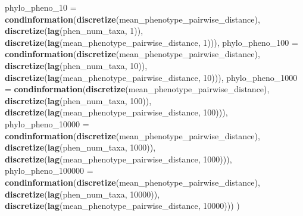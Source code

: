 \documentclass[]{book}
\newenvironment{Shaded}{\begin{snugshade}}{\end{snugshade}}
\newcommand{\DataTypeTok}[1]{\textcolor[rgb]{0.13,0.29,0.53}{#1}}
\newcommand{\DecValTok}[1]{\textcolor[rgb]{0.00,0.00,0.81}{#1}}
\newcommand{\KeywordTok}[1]{\textcolor[rgb]{0.13,0.29,0.53}{\textbf{#1}}}
\newcommand{\NormalTok}[1]{#1}
\begin{document}
\begin{Shaded}
\begin{Highlighting}[]
{  \DataTypeTok{phylo_pheno_10 =}     \KeywordTok{condinformation}\NormalTok{(}\KeywordTok{discretize}\NormalTok{(mean_phenotype_pairwise_distance),}
                                       \KeywordTok{discretize}\NormalTok{(}\KeywordTok{lag}\NormalTok{(phen_num_taxa, }\DecValTok{1}\NormalTok{)),}
                                       \KeywordTok{discretize}\NormalTok{(}\KeywordTok{lag}\NormalTok{(mean_phenotype_pairwise_distance, }\DecValTok{1}\NormalTok{))),}
  \DataTypeTok{phylo_pheno_100 =}    \KeywordTok{condinformation}\NormalTok{(}\KeywordTok{discretize}\NormalTok{(mean_phenotype_pairwise_distance),}
                                       \KeywordTok{discretize}\NormalTok{(}\KeywordTok{lag}\NormalTok{(phen_num_taxa, }\DecValTok{10}\NormalTok{)),}
                                       \KeywordTok{discretize}\NormalTok{(}\KeywordTok{lag}\NormalTok{(mean_phenotype_pairwise_distance, }\DecValTok{10}\NormalTok{))),}
  \DataTypeTok{phylo_pheno_1000 =}   \KeywordTok{condinformation}\NormalTok{(}\KeywordTok{discretize}\NormalTok{(mean_phenotype_pairwise_distance),}
                                       \KeywordTok{discretize}\NormalTok{(}\KeywordTok{lag}\NormalTok{(phen_num_taxa, }\DecValTok{100}\NormalTok{)),}
                                       \KeywordTok{discretize}\NormalTok{(}\KeywordTok{lag}\NormalTok{(mean_phenotype_pairwise_distance, }\DecValTok{100}\NormalTok{))),}
  \DataTypeTok{phylo_pheno_10000 =}  \KeywordTok{condinformation}\NormalTok{(}\KeywordTok{discretize}\NormalTok{(mean_phenotype_pairwise_distance),}
                                       \KeywordTok{discretize}\NormalTok{(}\KeywordTok{lag}\NormalTok{(phen_num_taxa, }\DecValTok{1000}\NormalTok{)),}
                                       \KeywordTok{discretize}\NormalTok{(}\KeywordTok{lag}\NormalTok{(mean_phenotype_pairwise_distance, }\DecValTok{1000}\NormalTok{))),}
  \DataTypeTok{phylo_pheno_100000 =} \KeywordTok{condinformation}\NormalTok{(}\KeywordTok{discretize}\NormalTok{(mean_phenotype_pairwise_distance),}
                                       \KeywordTok{discretize}\NormalTok{(}\KeywordTok{lag}\NormalTok{(phen_num_taxa, }\DecValTok{10000}\NormalTok{)),}
                                       \KeywordTok{discretize}\NormalTok{(}\KeywordTok{lag}\NormalTok{(mean_phenotype_pairwise_distance, }\DecValTok{10000}\NormalTok{)))}
\NormalTok{)}

}
\end{Highlighting}
\end{Shaded}
\end{document}

